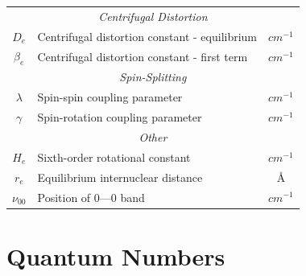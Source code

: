 \documentclass[11pt, twoside, fleqn]{report}
\newcommand{\dash}{\text{---}}
\begin{document}
\begin{table}[H]
\begin{tabular}{clc}
        \multicolumn{3}{c}{\textit{Centrifugal Distortion}}                                                            \\
        \cmidrule(lr){1-3}
        $D_e$         & Centrifugal distortion constant - equilibrium                               & $\unit{cm^{-1}}$ \\
        $\beta_e$     & Centrifugal distortion constant - first term                                & $\unit{cm^{-1}}$ \\
        \multicolumn{3}{c}{\textit{Spin-Splitting}}                                                                    \\
        \cmidrule(lr){1-3}
        $\lambda$     & Spin-spin coupling parameter                                                & $\unit{cm^{-1}}$ \\
        $\gamma$      & Spin-rotation coupling parameter                                            & $\unit{cm^{-1}}$ \\
        \multicolumn{3}{c}{\textit{Other}}                                                                             \\
        \cmidrule(lr){1-3}
        $H_e$         & Sixth-order rotational constant                                             & $\unit{cm^{-1}}$ \\
        $r_e$         & Equilibrium internuclear distance                                           & \AA              \\
        $\nu_{00}$    & Position of $0\dash0$ band                                                  & $\unit{cm^{-1}}$ \\
        \bottomrule
    \end{tabular}
\end{table}

\chapter{Quantum Numbers}
\label{a:quantum_numbers}
\end{document}
